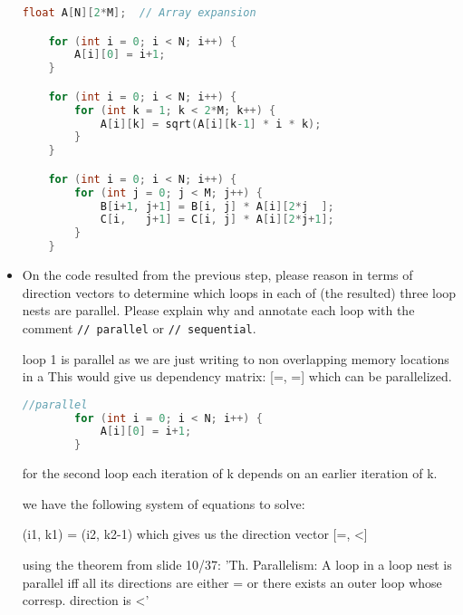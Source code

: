 \documentclass{article}
\begin{document}
\begin{itemize}
    \begin{lstlisting}[language=C]
    float A[N][2*M];  // Array expansion

    for (int i = 0; i < N; i++) {
        A[i][0] = i+1;
    }

    for (int i = 0; i < N; i++) {
        for (int k = 1; k < 2*M; k++) {
            A[i][k] = sqrt(A[i][k-1] * i * k);
        }
    }

    for (int i = 0; i < N; i++) {
        for (int j = 0; j < M; j++) {
            B[i+1, j+1] = B[i, j] * A[i][2*j  ];
            C[i,   j+1] = C[i, j] * A[i][2*j+1];
        }
    }
    \end{lstlisting}

    \item On the code resulted from the previous step, please reason in terms of direction
    vectors to determine which loops in each of (the resulted) three loop nests
    are parallel. Please explain why and annotate each loop with the comment
    \texttt{// parallel} or \texttt{// sequential}.

    loop 1 is parallel as we are just writing to non overlapping memory locations in a
    This would give us dependency matrix: [=, =] which can be parallelized.



    \begin{lstlisting}[language=c]
        //parallel
        for (int i = 0; i < N; i++) {
            A[i][0] = i+1;
        }
    \end{lstlisting}

    for the second loop each iteration of k depends on an earlier iteration of k.

    we have the following system of equations to solve:

    (i1, k1) = (i2, k2-1) which gives us the direction vector [=, <]

    using the theorem from slide 10/37:
    'Th. Parallelism: A loop in a loop nest is parallel iff all its directions
    are either = or there exists an outer loop whose corresp. direction is <'
    

\end{itemize}
\end{document}
